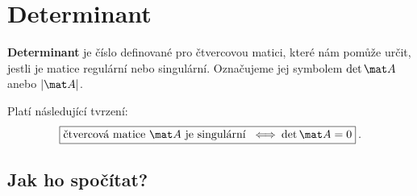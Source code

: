 \section*{Determinant}

\textbf{Determinant} je číslo definované pro čtvercovou matici, které nám pomůže určit, jestli je matice regulární nebo singulární. Označujeme jej symbolem $\det \mat A$ anebo $|\mat A|$.

Platí následující tvrzení:
\begin{align}
    \boxed{ \text{čtvercová matice } \mat A \text{ je singulární } \: \Longleftrightarrow \: \det \mat A = 0 } \:.
\end{align}

\subsection*{Jak ho spočítat?}

